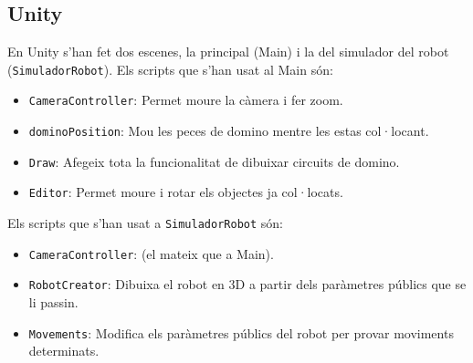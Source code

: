 \subsection{Unity}

En Unity s'han fet dos escenes, la principal (Main) i la del simulador del robot (\verb|SimuladorRobot|). Els scripts que s'han usat al Main són: 
\begin{itemize}
\item \verb|CameraController|: Permet moure la càmera i fer zoom.


\item \verb|dominoPosition|: Mou les peces de domino mentre les estas col·locant.


\item \verb|Draw|: Afegeix tota la funcionalitat de dibuixar circuits de domino.


\item \verb|Editor|: Permet moure i rotar els objectes ja col·locats.

\end{itemize}
Els scripts que s'han usat a \verb|SimuladorRobot| són:
\begin{itemize}
\item \verb|CameraController|: (el mateix que a Main).
\item \verb|RobotCreator|: Dibuixa el robot en 3D a partir dels paràmetres públics que se li passin.

\item \verb|Movements|: Modifica els paràmetres públics del robot per provar moviments determinats.

\end{itemize}




